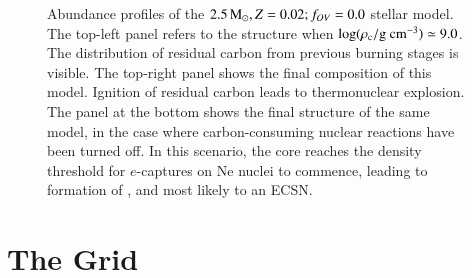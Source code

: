 \documentclass[main.tex]{subfiles}
\begin{document}
\begin{subappendices}
\begin{figure}[hbt!]
    \caption{Abundance profiles of the \seriesone $ 2.5\mathrm{\,M_\odot},  Z=0.02;f_{OV}=0.0$ stellar model. The top-left panel refers to the structure when $\rm \log(\rho_c / g \ cm^{-3}) \simeq 9.0$. The distribution of residual carbon from previous burning stages is visible. The top-right panel shows the final composition of this model. Ignition of residual carbon leads to thermonuclear explosion.
    The panel at the bottom shows the final structure of the same model, in the case where carbon-consuming nuclear reactions have been turned off.
    In this scenario, the core reaches the density threshold for $e$-captures on Ne nuclei to commence, leading to formation of , and most likely to an ECSN.}
    \label{apx:ch2:fig:eta1p0}
\end{figure}


\clearpage
\section{The \seriestwo Grid}\label{apx:ch2:composition_seriesII}


\end{subappendices}
\end{document}
